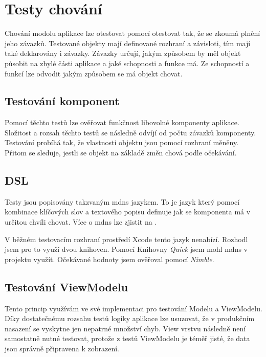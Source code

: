 \section{Testy chování}\label{testovani-bdd}

Chování modolu aplikace lze otestovat pomocí otestovat tak, že se zkoumá plnění jeho závazků.
Testované objekty mají definované rozhraní a závisloti, tím mají také deklarovány i závazky.
Závazky určují, jakým způsobem by měl objekt působit na zbylé části aplikace a jaké schopnosti a funkce má.
Ze schopností a funkcí lze odvodit jakým způsobem se má objekt chovat.

\subsection{Testování komponent}

Pomocí těchto testů lze ověřovat funkčnost libovolné komponenty aplikace.
Složitost a rozsah těchto testů se následně odvíjí od počtu závazků komponenty.
Testování probíhá tak, že vlastnosti objektu jsou pomocí rozhraní měněny.
Přitom se sleduje, jestli se objekt na základě změn chová podle očekávání. \cite{objcio-bdd}

\subsection{DSL}

Testy jsou popisovány takzvaným \acrshort{mdns} jazykem.
To je jazyk který pomocí kombinace klíčových slov a textového popisu definuje jak se komponenta má v určitou chvíli chovat.
Více o \acrshort{mdns} lze zjistit na \cite{petrikainulainen-dsl}.

V běžném testovacím rozhraní prostředí Xcode tento jazyk nenabízí.
Rozhodl jsem pro to využí dvou knihoven.
Pomocí Knihovny \textit{Quick} jsem mohl \acrshort{mdns} v projektu využít.
Očekávané hodnoty jsem ověřoval pomocí \textit{Nimble}.

\subsection{Testování ViewModelu}

Tento princip využívám ve své implementaci pro testování Modelu a ViewModelu.
Díky dostatečnému rozsahu testů logiky aplikace lze usuzovat, že v produkčním nasazení se vyskytne jen nepatrné množství chyb.
View vrstvu následně není samostatně nutné testovat, protože z testů ViewModelu je téměř jisté, že data jsou správně připravena k zobrazení.

